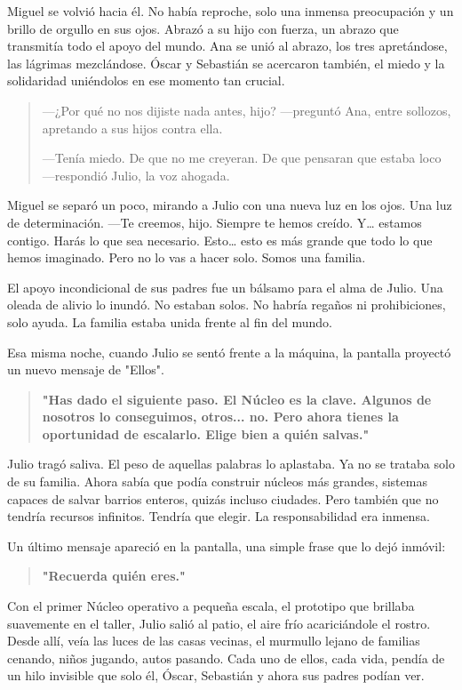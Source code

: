 \documentclass[a4paper,12pt]{book}
\begin{document}
Miguel se volvió hacia él. No había reproche, solo una inmensa preocupación y un brillo de orgullo en sus ojos. Abrazó a su hijo con fuerza, un abrazo que transmitía todo el apoyo del mundo. Ana se unió al abrazo, los tres apretándose, las lágrimas mezclándose. Óscar y Sebastián se acercaron también, el miedo y la solidaridad uniéndolos en ese momento tan crucial.

\begin{quote}
    —¿Por qué no nos dijiste nada antes, hijo? —preguntó Ana, entre sollozos, apretando a sus hijos contra ella.

    —Tenía miedo. De que no me creyeran. De que pensaran que estaba loco —respondió Julio, la voz ahogada.
\end{quote}

Miguel se separó un poco, mirando a Julio con una nueva luz en los ojos. Una luz de determinación. —Te creemos, hijo. Siempre te hemos creído. Y… estamos contigo. Harás lo que sea necesario. Esto… esto es más grande que todo lo que hemos imaginado. Pero no lo vas a hacer solo. Somos una familia.

El apoyo incondicional de sus padres fue un bálsamo para el alma de Julio. Una oleada de alivio lo inundó. No estaban solos. No habría regaños ni prohibiciones, solo ayuda. La familia estaba unida frente al fin del mundo.

Esa misma noche, cuando Julio se sentó frente a la máquina, la pantalla proyectó un nuevo mensaje de "Ellos".

\begin{quote}
    \textbf{"Has dado el siguiente paso. El Núcleo es la clave. Algunos de nosotros lo conseguimos, otros... no. Pero ahora tienes la oportunidad de escalarlo. Elige bien a quién salvas."}
\end{quote}

Julio tragó saliva. El peso de aquellas palabras lo aplastaba. Ya no se trataba solo de su familia. Ahora sabía que podía construir núcleos más grandes, sistemas capaces de salvar barrios enteros, quizás incluso ciudades. Pero también que no tendría recursos infinitos. Tendría que elegir. La responsabilidad era inmensa.

Un último mensaje apareció en la pantalla, una simple frase que lo dejó inmóvil:

\begin{quote}
    \textbf{"Recuerda quién eres."}
\end{quote}

Con el primer Núcleo operativo a pequeña escala, el prototipo que brillaba suavemente en el taller, Julio salió al patio, el aire frío acariciándole el rostro. Desde allí, veía las luces de las casas vecinas, el murmullo lejano de familias cenando, niños jugando, autos pasando. Cada uno de ellos, cada vida, pendía de un hilo invisible que solo él, Óscar, Sebastián y ahora sus padres podían ver.
\end{document}
